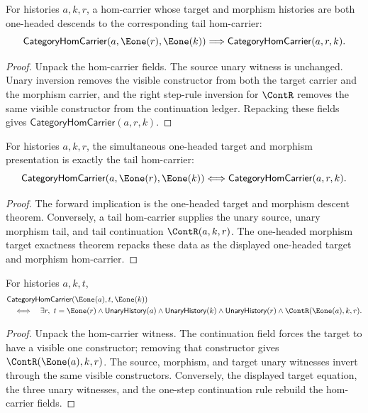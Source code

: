\begin{theorem}
\label{thm:category-hom-carrier-e1-target-morphism-exactness}
For histories $a,k,r$, a hom-carrier whose target and morphism histories are
both one-headed descends to the corresponding tail hom-carrier:
$$
\mathsf{CategoryHomCarrier}(a,\Eone(r),\Eone(k))
\Longrightarrow
\mathsf{CategoryHomCarrier}(a,r,k).
$$
\end{theorem}
\begin{proof}
Unpack the hom-carrier fields. The source unary witness is unchanged. Unary
inversion removes the visible constructor from both the target carrier and the
morphism carrier, and the right step-rule inversion for $\ContR$ removes the
same visible constructor from the continuation ledger. Repacking these fields
gives $\mathsf{CategoryHomCarrier}(a,r,k)$.
\end{proof}

\begin{theorem}
\label{thm:category-hom-carrier-e1-target-morphism-exactness-iff}
For histories $a,k,r$, the simultaneous one-headed target and morphism
presentation is exactly the tail hom-carrier:
$$
\mathsf{CategoryHomCarrier}(a,\Eone(r),\Eone(k))
\Longleftrightarrow
\mathsf{CategoryHomCarrier}(a,r,k).
$$
\end{theorem}
\begin{proof}
The forward implication is the one-headed target and morphism descent theorem.
Conversely, a tail hom-carrier supplies the unary source, unary morphism tail,
and tail continuation $\ContR(a,k,r)$. The one-headed morphism target
exactness theorem repacks these data as the displayed one-headed target and
morphism hom-carrier.
\end{proof}

\begin{theorem}
\label{thm:category-hom-e1-source-e1-morphism-target-iff}
For histories $a,k,t$,
$$
\begin{aligned}
&\mathsf{CategoryHomCarrier}(\Eone(a),t,\Eone(k)) \\
&\quad\Longleftrightarrow\quad
\exists r,\ t=\Eone(r)\land \mathsf{UnaryHistory}(a)\land
\mathsf{UnaryHistory}(k)\land \mathsf{UnaryHistory}(r)\land
\ContR(\Eone(a),k,r).
\end{aligned}
$$
\end{theorem}
\begin{proof}
Unpack the hom-carrier witness. The continuation field forces the target to
have a visible one constructor; removing that constructor gives
$\ContR(\Eone(a),k,r)$. The source, morphism, and target unary witnesses
invert through the same visible constructors. Conversely, the displayed target
equation, the three unary witnesses, and the one-step continuation rule rebuild
the hom-carrier fields.
\end{proof}

